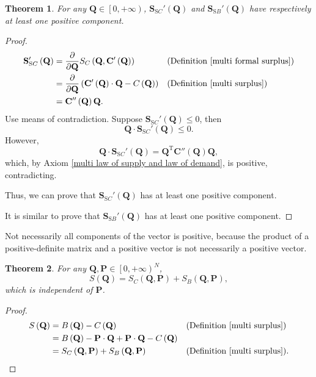 \documentclass{article}
\newtheorem{theorem}{Theorem}[subsection]
\begin{document}
\begin{theorem}
For any $\mathbf Q\in\left[0,+\infty\right)$,
$\mathbf S_{\mathrm SC}'\left(\mathbf Q\right)$ and $\mathbf S_{\mathrm SB}'\left(\mathbf Q\right)$ have respectively at least one positive component.
\end{theorem}
\begin{proof}
\begin{align*}
\mathbf S_{\mathrm SC}'\left(\mathbf Q\right)&=\frac\partial{\partial\mathbf Q}S_C\left(\mathbf Q,\mathbf C'\left(\mathbf Q\right)\right)&&\text{(Definition \ref{multi formal surplus})}\\
&=\frac\partial{\partial\mathbf Q}\left(\mathbf C'\left(\mathbf Q\right)\cdot\mathbf Q-C\left(\mathbf Q\right)\right)&&\text{(Definition \ref{multi surplus})}\\
&=\mathbf C''\left(\mathbf Q\right)\mathbf Q.
\end{align*}
Use means of contradiction.
Suppose $\mathbf S_{\mathrm SC}'\left(\mathbf Q\right)\le0$, then
$$\mathbf Q\cdot\mathbf S_{\mathrm SC}'\left(\mathbf Q\right)\le0.$$
However,
$$\mathbf Q\cdot\mathbf S_{\mathrm SC}'\left(\mathbf Q\right)=\mathbf Q^\mathrm T\mathbf C''\left(\mathbf Q\right)\mathbf Q,$$
which, by Axiom \ref{multi law of supply and law of demand}, is positive, contradicting.

Thus, we can prove that $\mathbf S_{\mathrm SC}'\left(\mathbf Q\right)$ has at least one positive component.

It is similar to prove that $\mathbf S_{\mathrm SB}'\left(\mathbf Q\right)$ has at least one positive component.
\end{proof}

Not necessarily all components of the vector is positive, because the product of a positive-definite matrix and a positive vector is not necessarily a positive vector.

\begin{theorem}
For any $\mathbf Q,\mathbf P\in\left[0,+\infty\right)^N$,
$$S\left(\mathbf Q\right)=S_C\left(\mathbf Q,\mathbf P\right)+S_B\left(\mathbf Q,\mathbf P\right),$$
which is independent of $\mathbf P$.
\end{theorem}
\begin{proof}
\begin{align*}
S\left(\mathbf Q\right)&=B\left(\mathbf Q\right)-C\left(\mathbf Q\right)&&\text{(Definition \ref{multi surplus})}\\
&=B\left(\mathbf Q\right)-\mathbf P\cdot\mathbf Q+\mathbf P\cdot\mathbf Q-C\left(\mathbf Q\right)\\
&=S_C\left(\mathbf Q,\mathbf P\right)+S_B\left(\mathbf Q,\mathbf P\right)&&\text{(Definition \ref{multi surplus})}.
\end{align*}
\end{proof}
\end{document}
